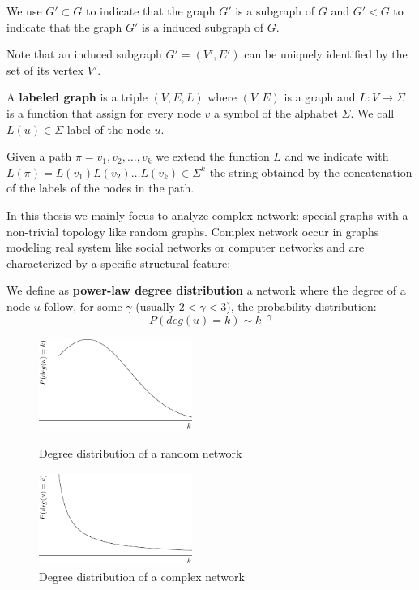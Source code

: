 We use $G' \subset G$ to indicate that the graph $G'$ is a subgraph of $G$ and $G' < G$ to indicate that the graph $G'$ is a induced subgraph of $G$.\medskip

Note that an induced subgraph $G' = (V', E')$ can be uniquely identified by the set of its vertex $V'$.

\begin{definizione}\label{def:labeledgraph}
	A \textbf{labeled graph} is a triple $(V,E,L)$ where $(V,E)$ is a graph and $L : V \rightarrow \Sigma$
	is a function that assign for every node $v$ a symbol of the alphabet $\Sigma$. We call $L(u) \in \Sigma$ label of the node $u$.
\end{definizione}

Given a path $\pi = v_{1}, v_{2}, \ldots, v_{k}$ we extend the function $L$ and we indicate with $L(\pi) = L(v_{1}) L(v_{2}) \ldots L(v_{k}) \in \Sigma^{k}$ the string obtained by the concatenation of the labels of the nodes in the path.\medskip

In this thesis we mainly focus to analyze complex network: special graphs with a non-trivial topology like random graphs. Complex network occur in graphs modeling real system like social networks or computer networks and are characterized by a specific structural feature:

\begin{definizione}\label{def:power-law-graph}
	We define as \textbf{power-law degree distribution} a network where the degree of a node $u$ follow, for some $\gamma$ (usually $2 < \gamma < 3$), the probability distribution:
	\begin{equation}
		P(deg(u) = k) \sim k^{-\gamma}  
	\end{equation}
\end{definizione}

\begin{figure}[h]
	\centering
	\begin{minipage}[t]{.45\textwidth}
		\centering
		\includegraphics[width=5cm,height=3cm]{figure/figure-1-1}
		\caption{Degree distribution of a random network}
	\end{minipage}\hfill
	\begin{minipage}[t]{.45\textwidth}
		\centering 
		\includegraphics[width=5cm,height=3cm]{figure/figure-1-2}
		\caption{Degree distribution of a complex network}
	\end{minipage}
\end{figure}

